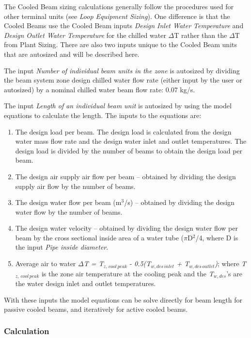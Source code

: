 The Cooled Beam sizing calculations generally follow the procedures used for other terminal units (see \emph{Loop Equipment Sizing}). One difference is that the Cooled Beams use the Cooled Beam inputs \emph{Design Inlet Water Temperature} and \emph{Design Outlet Water Temperature} for the chilled water \(\Delta\)T rather than the \(\Delta\)T from Plant Sizing. There are also two inputs unique to the Cooled Beam units that are autosized and will be described here.

The input \emph{Number of individual beam units in the zone} is autosized by dividing the beam system zone design chilled water flow rate (either input by the user or autosized) by a nominal chilled water beam flow rate: 0.07 kg/s.

The input \emph{Length of an individual beam unit} is autosized by using the model equations to calculate the length. The inputs to the equations are:

\begin{enumerate}
\item The design load per beam. The design load is calculated from the design water mass flow rate and the design water inlet and outlet temperatures. The design load is divided by the number of beams to obtain the design load per beam.
\item The design air supply air flow per beam -- obtained by dividing the design supply air flow by the number of beams.
\item The design water flow per beam (m\(^{3}\)/s) -- obtained by dividing the design water flow by the number of beams.
\item The design water velocity -- obtained by dividing the design water flow per beam by the cross sectional inside area of a water tube (\(\pi\)D\(^{2}\)/4, where D is the input \emph{Pipe inside diameter}.
\item Average air to water \emph{\(\Delta\)T = T\(_{z,\, cool\, peak}\)} - \emph{0.5(T\(_{w,des\, inlet}\)} \emph{+ T\(_{w,des\, outlet}\))}; where \emph{T\(_{z,\, cool\, peak}\)} is the zone air temperature at the cooling peak and the \emph{T\(_{w,des}\)}'s are the water design inlet and outlet temperatures.
\end{enumerate}

With these inputs the model equations can be solve directly for beam length for passive cooled beams, and iteratively for active cooled beams.

\subsubsection{Calculation}\label{calculation-3}

